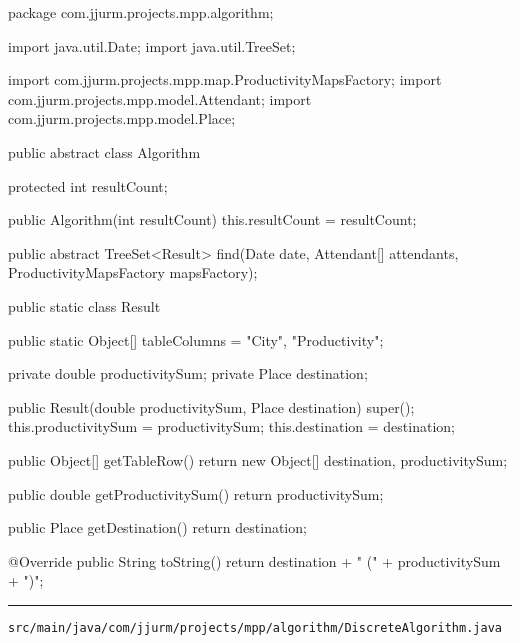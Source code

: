\begin{javacode}
package com.jjurm.projects.mpp.algorithm;

import java.util.Date;
import java.util.TreeSet;

import com.jjurm.projects.mpp.map.ProductivityMapsFactory;
import com.jjurm.projects.mpp.model.Attendant;
import com.jjurm.projects.mpp.model.Place;

public abstract class Algorithm {

  protected int resultCount;

  public Algorithm(int resultCount) {
    this.resultCount = resultCount;
  }

  public abstract TreeSet<Result> find(Date date, Attendant[] attendants,
      ProductivityMapsFactory mapsFactory);

  public static class Result {

    public static Object[] tableColumns = {"City", "Productivity"};

    private double productivitySum;
    private Place destination;

    public Result(double productivitySum, Place destination) {
      super();
      this.productivitySum = productivitySum;
      this.destination = destination;
    }

    public Object[] getTableRow() {
      return new Object[] {destination, productivitySum};
    }

    public double getProductivitySum() {
      return productivitySum;
    }

    public Place getDestination() {
      return destination;
    }

    @Override
    public String toString() {
      return destination + " (" + productivitySum + ")";
    }

  }

}
\end{javacode}

\noindent\rule{\textwidth}{0.4pt}

\nointerlineskip
\texttt{src/main/java/com/jjurm/projects/mpp/algorithm/DiscreteAlgorithm.java}

